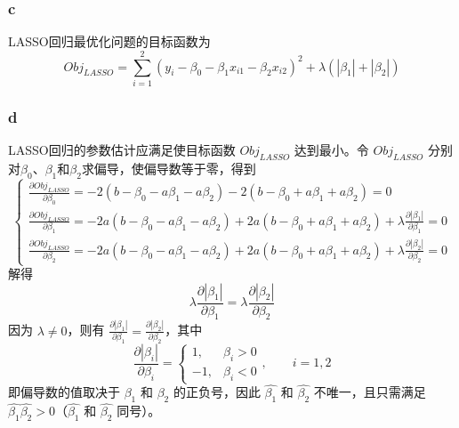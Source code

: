 \documentclass[12pt,a4paper]{article}
\begin{document}
    \subsubsection*{c}
    LASSO回归最优化问题的目标函数为
    \begin{equation}
        Obj_{LASSO}=\sum_{i=1}^2\left(y_i-\beta_0-\beta_1x_{i1}-\beta_2x_{i2}\right)^2+\lambda\left(\left|\beta_1\right|+\left|\beta_2\right|\right)
    \end{equation}
    \subsubsection*{d}
    LASSO回归的参数估计应满足使目标函数 $Obj_{LASSO}$ 达到最小。令 $Obj_{LASSO}$ 分别对$\beta_0$、$\beta_1$和$\beta_2$求偏导，使偏导数等于零，得到
    \begin{equation}
        \begin{cases}
            \frac{\partial Obj_{LASSO}}{\partial\beta_0}=-2\left(b-\beta_0-a\beta_1-a\beta_2\right)-2\left(b-\beta_0+a\beta_1+a\beta_2\right)=0\\
            \frac{\partial Obj_{LASSO}}{\partial\beta_1}=-2a\left(b-\beta_0-a\beta_1-a\beta_2\right)+2a\left(b-\beta_0+a\beta_1+a\beta_2\right)+\lambda\frac{\partial\left|\beta_1\right|}{\partial\beta_1}=0\\
            \frac{\partial Obj_{LASSO}}{\partial\beta_2}=-2a\left(b-\beta_0-a\beta_1-a\beta_2\right)+2a\left(b-\beta_0+a\beta_1+a\beta_2\right)+\lambda\frac{\partial\left|\beta_2\right|}{\partial\beta_2}=0
        \end{cases}
    \end{equation}
    解得
    \begin{equation}
        \lambda\frac{\partial\left|\beta_1\right|}{\partial\beta_1}=\lambda\frac{\partial\left|\beta_2\right|}{\partial\beta_2}
    \end{equation}
    因为 $\lambda\neq 0$，则有 $\frac{\partial\left|\beta_1\right|}{\partial\beta_1}=\frac{\partial\left|\beta_2\right|}{\partial\beta_2}$，其中
    \begin{equation}
        \frac{\partial\left|\beta_i\right|}{\partial\beta_i}=
        \begin{cases}
            1,&\beta_i>0\\
            -1,&\beta_i<0
        \end{cases}
        ,\qquad i=1,2
    \end{equation}
    即偏导数的值取决于 $\beta_1$ 和 $\beta_2$ 的正负号，因此 $\hat{\beta_1}$ 和 $\hat{\beta_2}$ 不唯一，且只需满足 $\hat{\beta_1}\hat{\beta_2}>0$（$\hat{\beta_1}$ 和 $\hat{\beta_2}$ 同号）。
\end{document}
